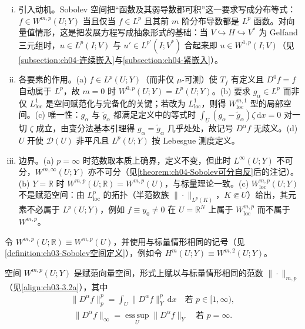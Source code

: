 \documentclass[../../main.tex]{subfiles}%
\begin{document}
\begin{remark}\label{remark:ch04-向量Sobolev动机}
\begin{enumerate}[(i)]
\item 引入动机。Sobolev 空间把“函数及其弱导数都可积”这一要求写成分布等式：$f\in W^{m,p}(U;Y)$ 当且仅当 $f\in L^p$ 且其前 $m$ 阶分布导数都是 $L^p$ 函数。对向量值情形，这是把发展方程写成抽象形式的基础：当 $V\hookrightarrow H\hookrightarrow V^*$ 为 Gelfand 三元组时，$u\in L^p(I;V)$ 与 $u'\in L^{p'}(I;V^*)$ 合起来即 $u\in W^{1,p}(I;V)$（见\cref{subsection:ch04-连续嵌入}与\cref{subsection:ch04-紧嵌入}）。

\item 各要素的作用。(a) $f\in L^p(U;Y)$（而非仅 $\mu$-可测）使 $T_f$ 有定义且 $D^0f=f$ 自动属于 $L^p$，故 $m=0$ 时 $W^{0,p}(U;Y)=L^p(U;Y)$。(b) 要求 $g_\alpha\in L^p$ 而非仅 $L^1_{\mathrm{loc}}$ 是空间赋范化与完备化的关键；若改为 $L^1_{\mathrm{loc}}$，则得 $W^{m,1}_{\mathrm{loc}}$ 型的局部空间。(c) 唯一性：$g_\alpha$ 与 $\widetilde g_\alpha$ 都满足定义中的等式时 $\int_U(g_\alpha-\widetilde g_\alpha)\zeta\,\mathrm{d}x=0$ 对一切 $\zeta$ 成立，由变分法基本引理得 $g_\alpha=\widetilde g_\alpha$ 几乎处处，故记号 $D^\alpha f$ 无歧义。(d) $U$ 开使 $\mathcal{D}(U)$ 非平凡且 $L^p(U;Y)$ 按 Lebesgue 测度定义。

\item 边界。(a) $p=\infty$ 时范数取本质上确界，定义不变，但此时 $L^\infty(U;Y)$ 不可分，$W^{m,\infty}(U;Y)$ 亦不可分（见\cref{theorem:ch04-Sobolev可分自反}后的注记）。(b) $Y=\mathbb{R}$ 时 $W^{m,p}(U;\mathbb{R})=W^{m,p}(U)$，与标量理论一致。(c) $W^{m,p}_{\mathrm{loc}}(U;Y)$ 不是赋范空间：由 $L^p_{\mathrm{loc}}$ 的拓扑（半范数族 $\|\cdot\|_{L^p(K)}$，$K\Subset U$）给出，其元素不必属于 $L^p(U;Y)$，例如 $f\equiv y_0\neq0$ 在 $U=\mathbb{R}^N$ 上属于 $W^{m,p}_{\mathrm{loc}}$ 而不属于 $W^{m,p}$。
\end{enumerate}
\end{remark}

令 $W^{m,p}(U;\mathbb{R})\equiv W^{m,p}(U)$，并使用与标量情形相同的记号（见\cref{definition:ch03-Sobolev空间定义}），例如令 $H^m(U;Y)\equiv W^{m,2}(U;Y)$。

空间 $W^{m,p}(U;Y)$ 是赋范向量空间，形式上赋以与标量情形相同的范数 $\|\cdot\|_{m,p}$（见\eqref{align:ch03-3.2a}），其中
\begin{align*}
\|D^\alpha f\|_p^p=\int_U\|D^\alpha f\|_Y^p\,\mathrm{d}x\quad\text{若 }p\in[1,\infty),
\end{align*}
\begin{align*}
\|D^\alpha f\|_\infty=\operatorname*{ess\,sup}_U\|D^\alpha f\|_Y\quad\text{若 }p=\infty.
\end{align*}
\end{document}
